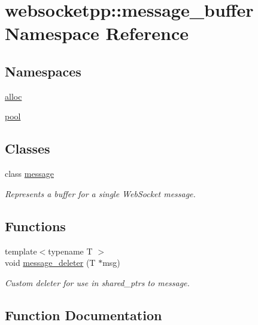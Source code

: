 \hypertarget{namespacewebsocketpp_1_1message__buffer}{}\section{websocketpp\+:\+:message\+\_\+buffer Namespace Reference}
\label{namespacewebsocketpp_1_1message__buffer}
\subsection*{Namespaces}
\begin{DoxyCompactItemize}
\item 
 \hyperlink{namespacewebsocketpp_1_1message__buffer_1_1alloc}{alloc}
\item 
 \hyperlink{namespacewebsocketpp_1_1message__buffer_1_1pool}{pool}
\end{DoxyCompactItemize}
\subsection*{Classes}
\begin{DoxyCompactItemize}
\item 
class \hyperlink{classwebsocketpp_1_1message__buffer_1_1message}{message}
\begin{DoxyCompactList}\small\item\em Represents a buffer for a single Web\+Socket message. \end{DoxyCompactList}\end{DoxyCompactItemize}
\subsection*{Functions}
\begin{DoxyCompactItemize}
\item 
{\footnotesize template$<$typename T $>$ }\\void \hyperlink{namespacewebsocketpp_1_1message__buffer_abb46c6d5b9cd984a158996029cadfa88}{message\+\_\+deleter} (T $\ast$msg)
\begin{DoxyCompactList}\small\item\em Custom deleter for use in shared\+\_\+ptrs to message. \end{DoxyCompactList}\end{DoxyCompactItemize}


\subsection{Function Documentation}
\hypertarget{namespacewebsocketpp_1_1message__buffer_abb46c6d5b9cd984a158996029cadfa88}{}
